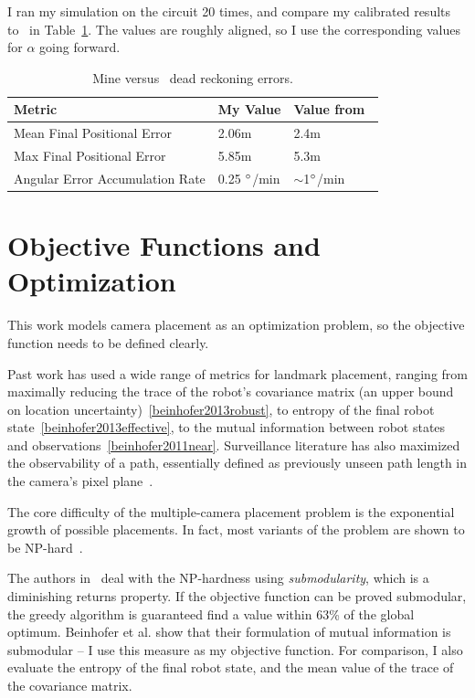 \documentclass[a4paper,12pt,twoside,openright]{report}
\begin{document}
I ran my simulation on the circuit 20 times, and compare my calibrated results to~\cite{vivacqua2017low} in
Table~\ref{tab:impl:calibration}. The values are roughly aligned, so I use
the corresponding values for $\alpha$ going forward.

\begin{table}[htb]
\centering
\caption[Noise Calibration Results]{Mine versus~\citeauthor{vivacqua2017low} dead reckoning errors.}
\label{tab:impl:calibration}
\begin{tabular}{@{}lll@{}}
\toprule
Metric                          & My Value           & Value from~\cite{vivacqua2017low} \\ \midrule
Mean Final Positional Error     & 2.06m              & 2.4m                                                          \\
Max Final Positional Error      & 5.85m              & 5.3m                                                          \\
Angular Error Accumulation Rate & 0.25 $\degree$/min & $\sim$1$\degree$/min                                         
\end{tabular}
\end{table}


\section{Objective Functions and Optimization}

This work models camera placement as an optimization problem, 
so the objective function needs to be defined clearly.

Past work has used a wide range of metrics for landmark placement, ranging from
maximally reducing the trace of the robot's covariance matrix (an upper bound on location
uncertainty)~\ref{beinhofer2013robust}, to entropy of the final
robot state~\ref{beinhofer2013effective}, to the mutual information between
robot states and observations~\ref{beinhofer2011near}. Surveillance literature
has also maximized the observability of a path, essentially defined as
previously unseen path length in the camera's pixel plane~\cite{bodor2007optimal}.

The core difficulty of the multiple-camera placement problem is the exponential
growth of possible placements. In fact, most variants of the problem are shown to be NP-hard~\cite{beinhofer2014landmark}.

The authors in~\cite{beinhofer2011near} deal with the NP-hardness 
using \textit{submodularity}, which is a diminishing returns property.
If the objective function can be proved submodular, the greedy
algorithm is guaranteed find a value within 63\% of the global optimum.
Beinhofer et al. show that their formulation of mutual information is submodular --
I use this measure as my objective function. For comparison, I also
evaluate the entropy of the final robot state, and the mean
value of the trace of the covariance matrix.
\end{document}
